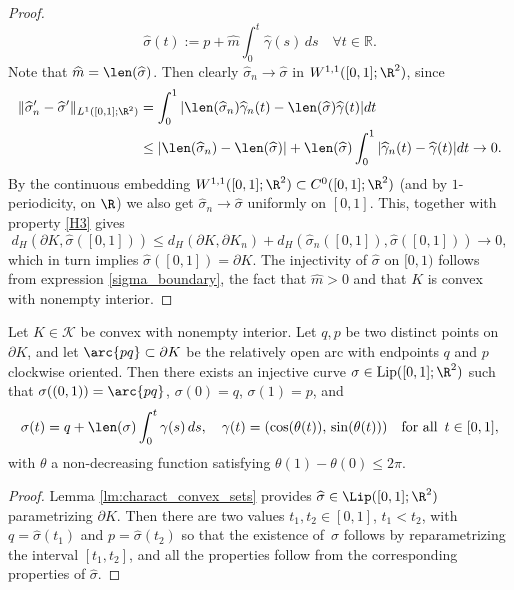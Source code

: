 \begin{proof}
\begin{equation}
\widehat \sigma(t):=p+\widehat m\int_0^t\widehat \gamma(s)\,ds\quad \forall t\in\mathbb R.
\end{equation}
Note that $\widehat m=\len(\widehat\sigma)$.
Then clearly $\widehat \sigma_n\to \widehat \sigma$ in $W^{1,1}([0,1];\R^2)$, since
\begin{equation}
\begin{split}
\|\widehat \sigma'_n-\widehat \sigma'\|_{L^1([0,1];\R^2)}&= \int_0^1|\len(\widehat\sigma_n) \widehat \gamma_n(t)-\len(\widehat\sigma)\widehat \gamma(t)|dt\\
&\le |\len(\widehat\sigma_n)-\len(\widehat\sigma)|+\len
(\widehat\sigma)\int_0^1|\widehat \gamma_n(t)-\widehat \gamma(t)|dt\to0.
\end{split}
\label{ti-chiamo-per-nome}
\end{equation}
By the continuous embedding $W^{1,1}([0,1];\R^2)\subset C^0([0,1];\R^2)$ (and by $1$-periodicity, on $\R$) we also get $\widehat \sigma_n\to\widehat \sigma$ uniformly on $[0,1]$.
This, together with property \ref{H3} gives
\begin{equation*}
d_H(\partial K,\widehat \sigma([0,1]))\le d_H(\partial K,\partial K_n)+d_H(\widehat \sigma_n([0,1]),\widehat \sigma([0,1]))\to0,
\end{equation*}
which in turn implies $\widehat\sigma([0,1])=\partial K$. The injectivity of $\widehat \sigma$ on $[0,1)$ follows from expression \eqref{sigma_boundary}, the fact that $\widehat m>0$ and that $K$ is convex with nonempty interior.
\end{proof}

\begin{cor}\label{lm:charact_convex_sets2}
Let $K\in\mathcal K$ be convex with nonempty interior. Let $q,p$ be two distinct points on $\partial K$, and let $\arc{pq}\subset\partial K$ be the relatively open arc with endpoints $q$ and $p$ clockwise oriented.
Then there exists an injective curve $\sigma\in {\rm{Lip}}([0,1];\R^2)$ such that $\sigma((0,1))=\arc{pq}$, $\sigma(0)=q$, $\sigma(1)=p$, and
\begin{equation*}
\sigma(t)=q+\len(\sigma)\int_0^t\gamma(s)\,ds,\quad \gamma(t)=(\cos(\theta(t)),\,\sin(\theta(t)))\quad \text{for all }\, t\in[0,1],
\end{equation*}
with $\theta$ a non-decreasing function satisfying $\theta(1)-\theta(0)\le2\pi$.
\end{cor}

\begin{proof}
Lemma \ref{lm:charact_convex_sets} provides $\widehat \sigma\in \Lip ([0,1];\R^2)$ parametrizing $\partial K$. Then there are two values $t_1,t_2\in [0,1]$, $t_1<t_2$, with $q=\widehat\sigma(t_1)$ and $p=\widehat\sigma(t_2)$ so that the existence of~$\sigma$ follows by reparametrizing the interval $[t_1,t_2]$, and all the properties follow from the corresponding properties of $\widehat \sigma$.
\end{proof}

